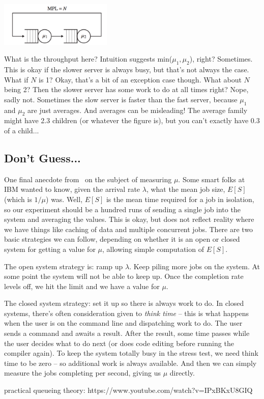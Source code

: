 \begin{center}
	\includegraphics[width=0.4\textwidth]{images/tandem-closed.png}
\end{center}

What is the throughput here? Intuition suggests min($\mu_{1}, \mu_{2}$), right? Sometimes. This is okay if the slower server is always busy, but that's not always the case. What if $N$ is 1? Okay, that's a bit of an exception case though. What about $N$ being 2? Then the slower server has some work to do at all times right? Nope, sadly not. Sometimes the slow server is faster than the fast server, because $\mu_{1}$ and $\mu_{2}$ are just averages. And averages can be misleading! The average family might have 2.3 children (or whatever the figure is), but you can't exactly have 0.3 of a child...

\subsection*{Don't Guess...}
One final anecdote from~\cite{pmd} on the subject of measuring $\mu$. Some smart folks at IBM wanted to know, given the arrival rate $\lambda$, what the mean job size, $E[S]$ (which is $1/\mu$) was. Well, $E[S]$ is the mean time required for a job in isolation, so our experiment should be a hundred runs of sending a single job into the system and averaging the values. This is okay, but does not reflect reality where we have things like caching of data and multiple concurrent jobs. There are two basic strategies we can follow, depending on whether it is an open or closed system for getting a value for $\mu$, allowing simple computation of $E[S]$.

The open system strategy is: ramp up $\lambda$. Keep piling more jobs on the system. At some point the system will not be able to keep up. Once the completion rate levels off, we hit the limit and we have a value for $\mu$.

The closed system strategy: set it up so there is always work to do. In closed systems, there's often consideration given to \textit{think time} -- this is what happens when the user is on the command line and dispatching work to do. The user sends a command and awaits a result. After the result, some time passes while the user decides what to do next (or does code editing before running the compiler again). To keep the system totally busy in the stress test, we need think time to be zero -- so additional work is always available. And then we can simply measure the jobs completing per second, giving us $\mu$ directly.




practical queueing theory:  https://www.youtube.com/watch?v=IPxBKxU8GIQ
